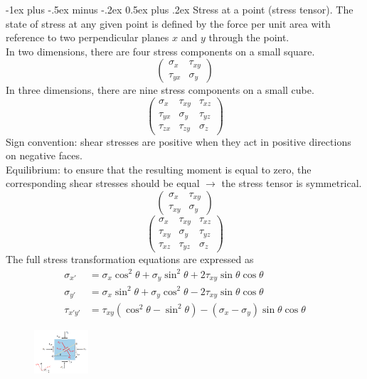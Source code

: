 \documentclass[10pt,landscape,a4paper]{article}
\makeatletter
\renewcommand{\section}{\@startsection{section}{1}{0mm}%
	{-1ex plus -.5ex minus -.2ex}%
	{0.5ex plus .2ex}%
	{\normalfont\large\bfseries}}
\makeatother
\begin{document}
\begin{multicols}{3}
	\section{Stress at a point (stress tensor).}
	The state of stress at any given point is defined by the force per unit area with reference to two perpendicular planes $ x $ and $ y $ through the point.\\
	In two dimensions, there are four stress components on a small square.
	\[
		\begin{pmatrix}
			\sigma_x  & \tau_{xy} \\
			\tau_{yx} & \sigma_y
		\end{pmatrix}
	\]
	In three dimensions, there are nine stress components on a small cube.
	\[
		\begin{pmatrix}
			\sigma_x  & \tau_{xy} & \tau_{xz} \\
			\tau_{yx} & \sigma_y  & \tau_{yz} \\
			\tau_{zx} & \tau_{zy} & \sigma_z
		\end{pmatrix}
	\]
	Sign convention: shear stresses are positive when they act in positive directions on negative faces.\\
	Equilibrium: to ensure that the resulting moment is equal to zero, the corresponding shear stresses should be equal $ \rightarrow $ the stress tensor is symmetrical.
	\[
		\begin{pmatrix}
			\sigma_x  & \tau_{xy} \\
			\tau_{xy} & \sigma_y
		\end{pmatrix}
	\]
	\[
		\begin{pmatrix}
			\sigma_x  & \tau_{xy} & \tau_{xz} \\
			\tau_{xy} & \sigma_y  & \tau_{yz} \\
			\tau_{xz} & \tau_{yz} & \sigma_z
		\end{pmatrix}
	\]
	The full stress transformation equations are expressed as
	\begin{align*}
		\sigma_{x'} & =\sigma_x\cos^2\theta+\sigma_y\sin^2\theta+2\tau_{xy}\sin\theta\cos\theta     \\
		\sigma_{y'} & =\sigma_x\sin^2\theta+\sigma_y\cos^2\theta-2\tau_{xy}\sin\theta\cos\theta     \\
		\tau_{x'y'} & =\tau_{xy}(\cos^2\theta-\sin^2\theta)-(\sigma_x-\sigma_y)\sin\theta\cos\theta
	\end{align*}
	\begin{figure}[H]
		\centering
		\includegraphics[width=0.18\textwidth]{stress-tensor}

\end{figure}
\end{multicols}
\end{document}
